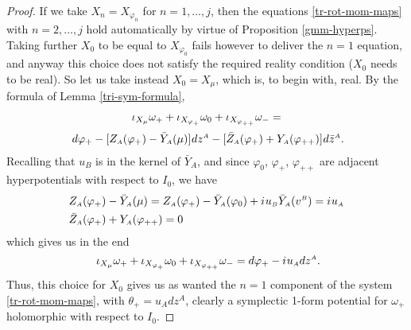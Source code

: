 \documentclass[11pt]{amsart}
\theoremstyle{remark}
\theoremstyle{remark}
\theoremstyle{definition}
\theoremstyle{definition}
\theoremstyle{definition}
\newcommand{\0}{{\scriptstyle 0'}} %
\newcommand{\1}{{\scriptstyle 1'}}
\newcommand{\A}{{\scriptscriptstyle A}} %
\newcommand{\B}{{\scriptscriptstyle B}}
\newcommand{\hp}{\hspace{0.5pt}} %
\begin{document}
\begin{proof}
If we take $X_n = X_{\varphi_n}$ for $n=1,\dots,j$, then the equations \eqref{tr-rot-mom-maps} with $n=2,\dots,j$ hold automatically by virtue of Proposition \ref{gmm-hyperps}. Taking further $X_0$ to be equal to $X_{\varphi_0}$ fails however to deliver the $n=1$ equation, and anyway this choice does not satisfy the required reality condition ($X_0$ needs to be real). So let us take instead $X_0 = X_{\mu}$, which is, to begin with, real. By the formula of Lemma \ref{tri-sym-formula},
\begin{gather}
\iota_{X_{\mu}}\omega_+ + \iota_{X_{\varphi_+}}\omega_0 + \iota_{X_{\varphi_{++}}}\omega_-  = \\[2pt]
d\varphi_+ - [Z_{\A}(\varphi_+) - \bar{Y}_{\A}(\mu)] \hp dz^{\A} - [\bar{Z}_{\A}(\varphi_+) + Y_{\A}(\varphi_{++})] \hp d\bar{z}^{\A} \rlap{.} \nonumber
\end{gather}
Recalling that $u_{\B}$ is in the kernel of $\bar{Y}_{\A}$, and since $\varphi_0$, $\varphi_+$, $\varphi_{++}$ are adjacent hyperpotentials with respect to $I_0$, we have
\begin{equation}
\begin{aligned}
& Z_{\A}(\varphi_+) - \bar{Y}_{\A}(\mu) = Z_{\A}(\varphi_+) - \bar{Y}_{\A}(\varphi_0) + i \hp u_{\B} \bar{Y}_{\A}(v^{\B}) = i \hp u_{\A} \\
& \bar{Z}_{\A}(\varphi_+) + Y_{\A}(\varphi_{++}) = 0 
\end{aligned}
\end{equation}
which gives us in the end
\begin{equation}
\iota_{X_{\mu}} \omega_+ + \iota_{X_{\varphi_+}} \omega_0 + \iota_{X_{\varphi_{++}}} \omega_- = d\varphi_+ - i \hp u_{\A} dz^{\A} \rlap{.}
\end{equation}
Thus, this choice for $X_0$ gives us as wanted the $n=1$ component of the system \eqref{tr-rot-mom-maps}, with \mbox{$\theta_+ = u_{\A} dz^{\A}$}, clearly a symplectic 1-form potential for $\omega_+$ holomorphic with respect to $I_0$. 


\end{proof}
\end{document}
